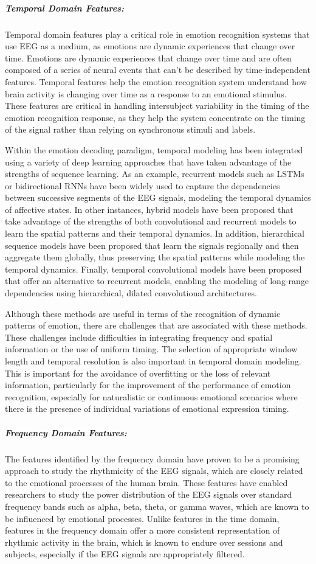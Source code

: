 \documentclass{WileyMSP-template}
\begin{document}
\subparagraph{Temporal Domain Features:}
Temporal domain features play a critical role in emotion recognition systems that use EEG as a medium, as emotions are dynamic experiences that change over time. Emotions are dynamic experiences that change over time and are often composed of a series of neural events that can't be described by time-independent features. Temporal features help the emotion recognition system understand how brain activity is changing over time as a response to an emotional stimulus. These features are critical in handling intersubject variability in the timing of the emotion recognition response, as they help the system concentrate on the timing of the signal rather than relying on synchronous stimuli and labels.

Within the emotion decoding paradigm, temporal modeling has been integrated using a variety of deep learning approaches that have taken advantage of the strengths of sequence learning. As an example, recurrent models such as LSTMs or bidirectional RNNs have been widely used to capture the dependencies between successive segments of the EEG signals, modeling the temporal dynamics of affective states. In other instances, hybrid models have been proposed that take advantage of the strengths of both convolutional and recurrent models to learn the spatial patterns and their temporal dynamics. In addition, hierarchical sequence models have been proposed that learn the signals regionally and then aggregate them globally, thus preserving the spatial patterns while modeling the temporal dynamics. Finally, temporal convolutional models have been proposed that offer an alternative to recurrent models, enabling the modeling of long-range dependencies using hierarchical, dilated convolutional architectures.

Although these methods are useful in terms of the recognition of dynamic patterns of emotion, there are challenges that are associated with these methods. These challenges include difficulties in integrating frequency and spatial information or the use of uniform timing. The selection of appropriate window length and temporal resolution is also important in temporal domain modeling. This is important for the avoidance of overfitting or the loss of relevant information, particularly for the improvement of the performance of emotion recognition, especially for naturalistic or continuous emotional scenarios where there is the presence of individual variations of emotional expression timing.

\subparagraph{Frequency Domain Features:}
The features identified by the frequency domain have proven to be a promising approach to study the rhythmicity of the EEG signals, which are closely related to the emotional processes of the human brain. These features have enabled researchers to study the power distribution of the EEG signals over standard frequency bands such as alpha, beta, theta, or gamma waves, which are known to be influenced by emotional processes. Unlike features in the time domain, features in the frequency domain offer a more consistent representation of rhythmic activity in the brain, which is known to endure over sessions and subjects, especially if the EEG signals are appropriately filtered. 
\end{document}
